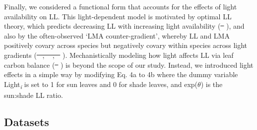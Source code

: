 \documentclass[
  12pt,
  letterpaper,
  DIV=11,
  numbers=noendperiod]{scrartcl}
\providecommand{\DIFadd}[1]{{\protect\color{blue}\uwave{#1}}} %
\providecommand{\DIFdel}[1]{{\protect\color{red}\sout{#1}}}                      %
\providecommand{\DIFaddbegin}{} %
\providecommand{\DIFaddend}{} %
\providecommand{\DIFdelbegin}{} %
\providecommand{\DIFdelend}{} %
\newcommand{\DIFscaledelfig}{0.5}
\newlength{\DIFdelgraphicswidth} %
\newlength{\DIFdelgraphicsheight} %
\newcommand{\DIFaddincludegraphics}[2][]{{\color{blue}\fbox{\DIFOincludegraphics[#1]{#2}}}} %
\newcommand{\DIFdelincludegraphics}[2][]{%
\sbox{\DIFdelgraphicsbox}{\DIFOincludegraphics[#1]{#2}}%
\settoboxwidth{\DIFdelgraphicswidth}{\DIFdelgraphicsbox} %
\settoboxtotalheight{\DIFdelgraphicsheight}{\DIFdelgraphicsbox} %
\scalebox{\DIFscaledelfig}{%
\parbox[b]{\DIFdelgraphicswidth}{\usebox{\DIFdelgraphicsbox}\\[-\baselineskip] \rule{\DIFdelgraphicswidth}{0em}}\llap{\resizebox{\DIFdelgraphicswidth}{\DIFdelgraphicsheight}{%
\setlength{\unitlength}{\DIFdelgraphicswidth}%
\begin{picture}(1,1)%
\thicklines\linethickness{2pt} %
{\color[rgb]{1,0,0}\put(0,0){\framebox(1,1){}}}%
{\color[rgb]{1,0,0}\put(0,0){\line( 1,1){1}}}%
{\color[rgb]{1,0,0}\put(0,1){\line(1,-1){1}}}%
\end{picture}%
}\hspace*{3pt}}} %
} %
\DeclareRobustCommand{\DIFaddbegin}{\DIFOaddbegin \let\includegraphics\DIFaddincludegraphics} %
\DeclareRobustCommand{\DIFaddend}{\DIFOaddend \let\includegraphics\DIFOincludegraphics} %
\DeclareRobustCommand{\DIFdelbegin}{\DIFOdelbegin \let\includegraphics\DIFdelincludegraphics} %
\DeclareRobustCommand{\DIFdelend}{\DIFOaddend \let\includegraphics\DIFOincludegraphics} %
\begin{document}
Finally, we considered a functional form that accounts for the effects
of light availability on LL. This light-dependent model is motivated by
optimal LL theory, which predicts decreasing LL with increasing light
availability (\DIFdelbegin \DIFdel{\mbox{%
\citeproc{ref-Kikuzawa1991}{Kikuzawa 1991}}\hspace{0pt}%
}\DIFdelend \DIFaddbegin \DIFadd{\mbox{%
\citeproc{ref-Kikuzawa1991}{Kikuzawa, 1991}}\hspace{0pt}%
}\DIFaddend ), and also by
the often-observed `LMA counter-gradient', whereby LL and LMA positively
covary across species but negatively covary within species across light
gradients (\DIFdelbegin \DIFdel{\mbox{%
\citeproc{ref-Lusk2008}{Lusk et al. 2008}}\hspace{0pt}%
,
\mbox{%
\citeproc{ref-Russo2016}{Russo and Kitajima 2016}}\hspace{0pt}%
,
\mbox{%
\citeproc{ref-Osnas2018}{Osnas et al. 2018}}\hspace{0pt}%
}\DIFdelend \DIFaddbegin \DIFadd{\mbox{%
\citeproc{ref-Lusk2008}{Lusk et al., 2008}}\hspace{0pt}%
;
\mbox{%
\citeproc{ref-Osnas2018}{Osnas et al., 2018}}\hspace{0pt}%
;
\mbox{%
\citeproc{ref-Russo2016}{Russo and Kitajima, 2016}}\hspace{0pt}%
}\DIFaddend ). Mechanistically
modeling how light affects LL via leaf carbon balance
(\DIFdelbegin \DIFdel{\mbox{%
}\hspace{0pt}%
}\DIFdelend \DIFaddbegin \DIFadd{\mbox{%
\citeproc{ref-Xu2017}{Xu et al., 2017}}\hspace{0pt}%
}\DIFaddend ) is beyond the scope of our
study. Instead, we introduced light effects in a simple way by modifying
Eq. 4a to 4b where the dummy variable Light\textsubscript{\emph{i}} is
set to 1 for sun leaves and 0 for shade leaves, and exp(\(\theta\)) is
the sun:shade LL ratio.

\subsection{Datasets}\label{datasets}
\end{document}
